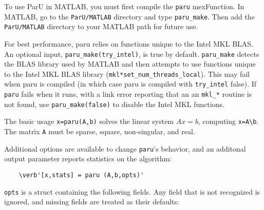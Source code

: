\documentclass[12pt]{article}
\begin{document}
To use ParU in MATLAB, you must first compile the \verb'paru' mexFunction.
In MATLAB, go to the \verb'ParU/MATLAB' directory and type \verb'paru_make'.
Then add the \verb'ParU/MATLAB' directory to your MATLAB path for future use.

For best performance, paru relies on functions unique to the Intel MKL BLAS.
An optional input, \verb'paru_make(try_intel)', is true by default.
\verb'paru_make' detects the BLAS library used by MATLAB and then attempts to
use functions unique to the Intel MKL BLAS library
(\verb'mkl*set_num_threads_local').  This may fail when paru is compiled (in
which case paru is compiled with \verb'try_intel' false).  If \verb'paru' fails
when it runs, with a link error reporting that an an \verb'mkl_*' routine is
not found, use \verb'paru_make(false)' to disable the Intel MKL functions.

The basic usage \verb'x=paru(A,b)' solves the linear system $Ax=b$, computing
\verb'x=A\b'.  The matrix \verb'A' must be sparse, square, non-singular, and
real.

Additional options are available to change \verb'paru''s behavior, and
an additonal output parameter reports statistics on the algorithm:

    \begin{verbatim}
    \verb'[x,stats] = paru (A,b,opts)'
    \end{verbatim}

\verb'opts' is a struct containing the following fields.  Any field that is not
recognized is ignored, and missing fields are treated as their defaults:
\end{document}
